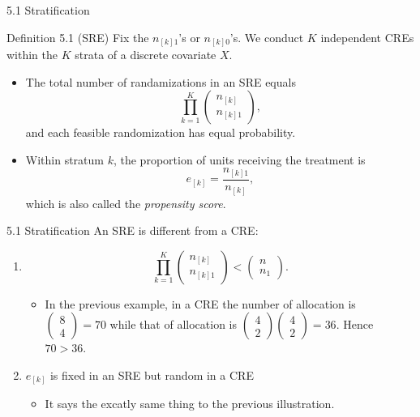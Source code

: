 \documentclass[aspectratio=169, 12pt]{beamer}
\begin{document}
\begin{frame}{5.1 Stratification}
  \begin{keybox}{Definition 5.1 (SRE)}
    Fix the $n_{[k]1}$'s or $n_{[k]0}$'s. We conduct $K$ independent CREs within the $K$ strata of a discrete covariate $X$.
  \end{keybox}
  \begin{itemize}
    \item The total number of randamizations in an SRE equals 
    \[
    \prod_{k=1}^{K}\begin{pmatrix}
      n_{[k]} \\ n_{[k]1}
    \end{pmatrix},
    \]
    and each feasible randomization has equal probability.
    \item Within stratum $k$, the proportion of units receiving the treatment is 
    \[
    e_{[k]}=\frac{n_{[k]1}}{n_{[k]}},
    \]
    which is also called the \textit{propensity score}.
  \end{itemize}
\end{frame}

\begin{frame}{5.1 Stratification}
  An SRE is different from a CRE:
  \begin{enumerate}
    \item \[\prod_{k=1}^{K}\begin{pmatrix}
      n_{[k]}\\n_{[k]1}
    \end{pmatrix}<\begin{pmatrix}
      n\\n_1
    \end{pmatrix}.\]
    \begin{itemize}
      \item In the previous example, in a CRE the number of allocation is $\begin{pmatrix}
        8\\4
      \end{pmatrix}=70$ while that of allocation is $\begin{pmatrix}
        4\\2
      \end{pmatrix}\begin{pmatrix}
        4\\2
      \end{pmatrix}=36$. Hence $70>36.$
    \end{itemize}
    \item $e_{[k]}$ is fixed in an SRE but random in a CRE
    \begin{itemize}
      \item It says the excatly same thing to the previous illustration.
    \end{itemize}
  \end{enumerate}
\end{frame}
\end{document}
